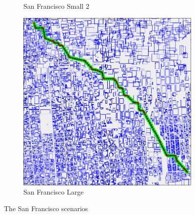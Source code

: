 \begin{figure}
\begin{subfigure}[t]{0.46\textwidth}
        		\caption{San Francisco Small 2}
        		\label{fig:sf-small-2}
	\end{subfigure}	
	\par
	\begin{subfigure}[t]{0.8\textwidth}
        		\includegraphics[width=\textwidth]{img/sf-large}
        		\caption{San Francisco Large}
        		\label{fig:sf-large}
	\end{subfigure}
        
    \caption{The San Francisco scenarios}\label{fig:sf-scens}
\end{figure}

\clearpage
